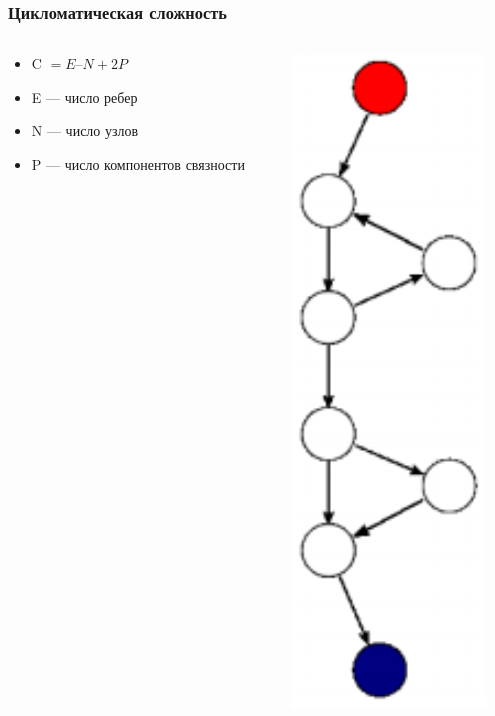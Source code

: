 \documentclass{../../slides-style}
\begin{document}
    \begin{frame}
        \frametitle{Цикломатическая сложность}
        \begin{columns}
            \begin{column}{0.7\textwidth}
                \begin{itemize}
                    \item C $= E – N + 2P$
                    \item E --- число ребер
                    \item N --- число узлов
                    \item P --- число компонентов связности
                \end{itemize}
            \end{column}
            \begin{column}{0.3\textwidth}
                \begin{center}
                    \includegraphics[height=0.8\textheight]{programGraph.png}
                \end{center}
            \end{column}
        \end{columns}
    \end{frame}
\end{document}
